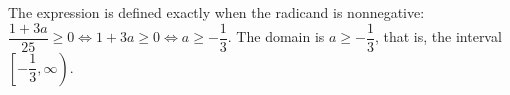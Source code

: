The expression is defined exactly when the radicand is nonnegative: $\dfrac{1+3a}{25}\ge0\iff1+3a\ge0\iff a\ge-\dfrac{1}{3}$. The domain is $\boxed{a\ge-\dfrac{1}{3}}$, that is, the interval $\left[-\dfrac{1}{3},\infty\right)$.
